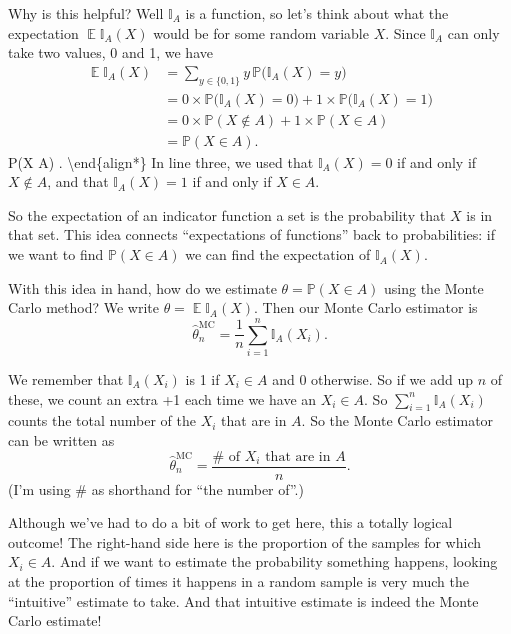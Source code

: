 \documentclass[
  letterpaper,
  DIV=11,
  numbers=noendperiod]{scrreprt}
\newcommand{\Exg}{\operatorname{\mathbb{E}}}
\newcommand{\Ind}{\mathbb{I}}
\theoremstyle{plain}
\theoremstyle{definition}
\theoremstyle{definition}
\theoremstyle{remark}
\begin{document}
Why is this helpful? Well \(\Ind_A\) is a function, so let's think about
what the expectation \(\Exg \Ind_A(X)\) would be for some random
variable \(X\). Since \(\Ind_A\) can only take two values, 0 and 1, we
have \begin{align*}
\Exg \Ind_A(X) &= \sum_{y \in\{0,1\}} y\,\mathbb P\big( \Ind_A(X) = y \big) \\\
  &= 0 \times \mathbb P\big( \Ind_A(X) = 0 \big) + 1 \times \mathbb P\big( \Ind_A(X) = 1 \big) \\
  &= 0 \times \mathbb P(X \notin A) + 1 \times \mathbb P(X \in A) \\
  &= \mathbb P(X \in A) .
\end{align*} P(X \in A) . \textbackslash end\{align*\} In line three, we
used that \(\Ind_A(X) = 0\) if and only if \(X \notin A\), and that
\(\Ind_A(X) = 1\) if and only if \(X \in A\).

So the expectation of an indicator function a set is the probability
that \(X\) is in that set. This idea connects ``expectations of
functions'' back to probabilities: if we want to find
\(\mathbb P(X \in A)\) we can find the expectation of \(\Ind_A(X)\).

With this idea in hand, how do we estimate
\(\theta = \mathbb P(X \in A)\) using the Monte Carlo method? We write
\(\theta = \Exg\Ind_A(X)\). Then our Monte Carlo estimator is
\[  \widehat{\theta}_n^{\mathrm{MC}} = \frac{1}{n} \sum_{i=1}^n \Ind_A(X_i) . \]

We remember that \(\Ind_A(X_i)\) is 1 if \(X_i \in A\) and 0 otherwise.
So if we add up \(n\) of these, we count an extra +1 each time we have
an \(X_i \in A\). So \(\sum_{i=1}^n \Ind_A(X_i)\) counts the total
number of the \(X_i\) that are in \(A\). So the Monte Carlo estimator
can be written as
\[  \widehat{\theta}_n^{\mathrm{MC}} = \frac{\# \text{ of } X_i \text{ that are in $A$}}{n} . \]
(I'm using \(\#\) as shorthand for ``the number of''.)

Although we've had to do a bit of work to get here, this a totally
logical outcome! The right-hand side here is the proportion of the
samples for which \(X_i \in A\). And if we want to estimate the
probability something happens, looking at the proportion of times it
happens in a random sample is very much the ``intuitive'' estimate to
take. And that intuitive estimate is indeed the Monte Carlo estimate!
\end{document}
